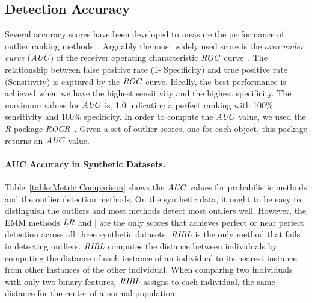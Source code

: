 {\subsection{Detection Accuracy} \label{sec:detection} Several accuracy scores have been developed to measure the performance of outlier ranking methods~\citep{aggarwal2013}. Arguably the most widely used score is the {\em area under curve} ($\it{AUC}$) of the receiver operating characteristic $\it{ROC}$ curve~\citep{Fawcett2006,Cansado2008,Muller2012}. 
		The relationship between false positive rate (1- Specificity) and true positive rate (Sensitivity) is captured by the $\it{ROC}$ curve. Ideally, the best performance is achieved when we have the highest sensitivity and the highest specificity. 
		The maximum values for $\it{AUC}$ is, 1.0 indicating a perfect ranking with 100\% sensitivity and 100\% specificity. In order to compute the $\it{AUC}$ value, we used the \textit{R} package \textit{ROCR}~\citep{RROCR2012}. Given a set of outlier scores, one for each object, this package returns an $\it{AUC}$ value. 



	\paragraph{AUC Accuracy in Synthetic Datasets.}
	Table~\ref{table:Metric Comparison} shows the $\it{AUC}$ values for probabilistic methods and the outlier detection methods. On the synthetic data, it ought to be easy to distinguish the outliers and most methods detect most outliers well.  However, the EMM methods $\it{LR}$ and $\mid$ are the only scores that achieves perfect or near perfect detection across all three synthetic datasets. $\it{RIBL}$ is the only method that fails in detecting outliers. $\it{RIBL}$ computes the distance between individuals by computing the distance of each instance of an individual to its nearest instance from other instances of the other individual. When comparing two individuals with only two binary features, $\it{RIBL}$ assigns to each individual, the same distance for the center of a normal population.
	
}
